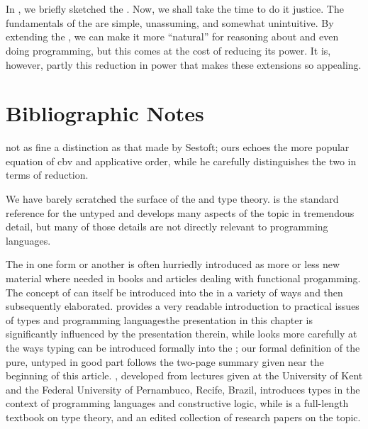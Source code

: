\label{functional:theory}

\section{\LambdaCalc}
In , we briefly sketched the \lambdacalc{}. Now, we shall take the time to do it justice. The fundamentals of the \lambdacalc are simple, unassuming, and somewhat unintuitive. By extending the \lambdacalc{}, we can make it more ``natural'' for reasoning about and even doing programming, but this comes at the cost of reducing its power. It is, however, partly this reduction in power that makes these extensions so appealing.




\section{Bibliographic Notes}
not as fine a distinction as that made by Sestoft; ours echoes the more popular equation of cbv and applicative order, while he carefully distinguishes the two in terms of \lambdacalc reduction.

We have barely scratched the surface of the \lambdacalc and type theory. \citet{Barendregt:The-Lambda:1984} is the standard reference for the untyped \lambdacalc and develops many aspects of the topic in tremendous detail, but many of those details are not directly relevant to programming languages.

The \lambdacalc in one form or another is often hurriedly introduced as more or less new material where needed in books and articles dealing with functional progamming. The concept of  can itself be introduced into the \lambdacalc in a variety of ways and then subsequently elaborated. \citet{Cardelli:On-understanding:1985} provides a very readable introduction to practical issues of types and programming languages\empause the presentation in this chapter is significantly influenced by the presentation therein\empause, while \citet{Barendregt:Types:1990} looks more carefully at the ways typing can be introduced formally into the \lambdacalc{}; our formal definition of the pure, untyped \lambdacalc in good part follows the two-page summary given near the beginning of this article. \citet{Thompson:Type:1991}, developed from lectures given at the University of Kent and the Federal University of Pernambuco, Recife, Brazil, introduces types in the context of programming languages and constructive logic, while \citet{Pierce:Types:2002} is a full-length textbook on type theory, and \citet{Pierce:Advanced:2005} an edited collection of research papers on the topic.
